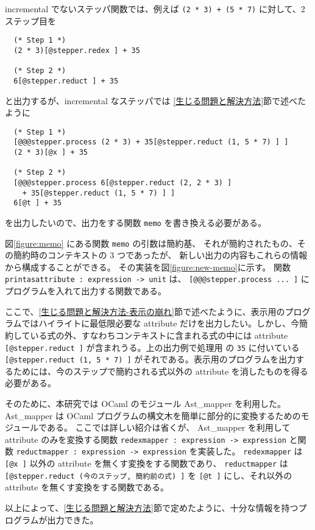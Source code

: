 incremental でないステッパ関数では、例えば \texttt{(2 * 3) + (5 * 7)} に対して、2 ステップ目を
\begin{verbatim}
  (* Step 1 *)
  (2 * 3)[@stepper.redex ] + 35

  (* Step 2 *)
  6[@stepper.reduct ] + 35
\end{verbatim}
と出力するが、incremental なステッパでは \ref{生じる問題と解決方法}節で述べたように
\begin{verbatim}
  (* Step 1 *)
  [@@@stepper.process (2 * 3) + 35[@stepper.reduct (1, 5 * 7) ] ]
  (2 * 3)[@x ] + 35

  (* Step 2 *)
  [@@@stepper.process 6[@stepper.reduct (2, 2 * 3) ]
    + 35[@stepper.reduct (1, 5 * 7) ] ]
  6[@t ] + 35
\end{verbatim}
を出力したいので、出力をする関数 \texttt{memo} を書き換える必要がある。

図\ref{figure:memo} にある関数 \texttt{memo} の引数は簡約基、
それが簡約されたもの、その簡約時のコンテキストの 3 つであったが、
新しい出力の内容もこれらの情報から構成することができる。
その実装を図\ref{figure:new-memo}に示す。
関数 \texttt{print\US as\US attribute :\ expression -> unit} は、
\texttt{[@@@stepper.process ... ]} にプログラムを入れて出力する関数である。

ここで、\ref{生じる問題と解決方法-表示の崩れ}節で述べたように、表示用のプログラムではハイライトに最低限必要な attribute だけを出力したい。しかし、今簡約している式の外、すなわちコンテキストに含まれる式の中には attribute \texttt{[@stepper.reduct ]} が含まれうる。上の出力例で処理用
の \texttt{35} に付いている \texttt{[@stepper.reduct (1, 5 * 7) ]} がそれである。表示用のプログラムを出力するためには、今のステップで簡約される式以外の attribute を消したものを得る必要がある。

そのために、本研究では OCaml のモジュール Ast\_mapper を利用した。
Ast\_mapper は OCaml プログラムの構文木を簡単に部分的に変換するためのモジュールである。
ここでは詳しい紹介は省くが、
Ast\_mapper を利用して attribute のみを変換する関数
\texttt{redex\US mapper :\ expression -> expression} と関数
\texttt{reduct\US mapper :\ expression -> expression} を実装した。
\texttt{redex\US mapper} は \texttt{[@x ]} 以外の attribute を無くす変換をする関数であり、
\texttt{reduct\US mapper} は \texttt{[@stepper.reduct (今のステップ, 簡約前の式) ]} を
\texttt{[@t ]} にし、それ以外の attribute を無くす変換をする関数である。

以上によって、\ref{生じる問題と解決方法}節で定めたように、十分な情報を持つプログラムが出力できた。


